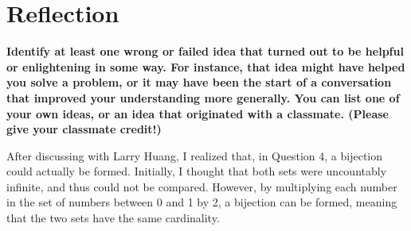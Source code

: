 \documentclass[article, 12pt]{article}
\theoremstyle{definition}
\begin{document}
    \section{Reflection}
    \textbf{Identify at least one wrong or failed idea that turned out to be helpful or enlightening in some way. For instance, that idea might have helped you solve a problem, or it may have been the start of a conversation that improved your understanding more generally. You can list one of your own ideas, or an idea that originated with a classmate. (Please give your classmate credit!)}

    After discussing with Larry Huang, I realized that, in Question 4, a bijection could actually be formed. Initially, I thought that both sets were uncountably infinite, and thus could not be compared. However, by multiplying each number in the set of numbers between 0 and 1 by 2, a bijection can be formed, meaning that the two sets have the same cardinality.
\end{document}
